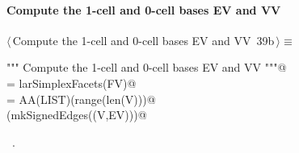 \documentclass[11pt,oneside]{article}    %
\begin{document}
\paragraph{Compute the 1-cell and 0-cell bases EV and VV}
\begin{flushleft} \small \label{scrap64}
\protect{}$\langle\,$Compute the 1-cell and 0-cell bases EV and VV\nobreak\ {\footnotesize 39b}$\,\rangle\equiv$
\vspace{-1ex}
\begin{list}{}{} \item
\mbox{}\verb@""" Compute the 1-cell and 0-cell bases EV and VV """@\\
\mbox{}\verb@EV = larSimplexFacets(FV)@\\
\mbox{}\verb@VV = AA(LIST)(range(len(V)))@\\
\mbox{}\verb@VIEW(mkSignedEdges((V,EV)))@\\
\mbox{}\verb@@{\NWsep}
\end{list}
\vspace{-1ex}
\footnotesize\addtolength{\baselineskip}{-1ex}
\begin{list}{}{\setlength{\itemsep}{-\parsep}\setlength{\itemindent}{-\leftmargin}}
\item \NWtxtMacroRefIn\ .
\end{list}
\end{flushleft}
\end{document}

